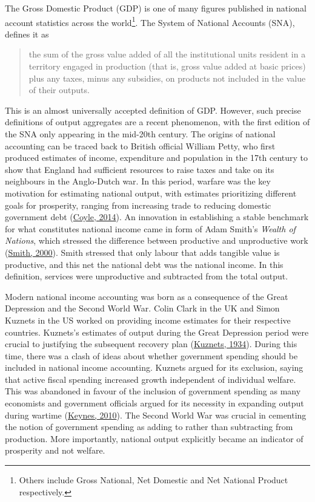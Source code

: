 \documentclass[12pt,nobind, a4paper]{reedthesis}
\begin{document}
 The Gross Domestic Product (GDP) is one of many figures published in national account statistics across the world\footnote{Others include Gross National, Net Domestic and Net National Product respectively.}. The System of National Accounts (SNA), defines it as
 \begin{quote}
 the sum of the gross value added of all the institutional units resident in a territory engaged in production (that is, gross value added at basic prices) plus any taxes, minus any subsidies, on products not included in the value of their 
 outputs.
 \end{quote}
 This is an almost universally accepted definition of GDP. However, such precise definitions of output aggregates are a recent phenomenon, with the first edition of the SNA only appearing in the mid-20th century. The origins of national accounting can be traced back to British official William Petty, who first produced estimates of income, expenditure and population in the 17th century to show that England had sufficient resources to raise taxes and take on its neighbours in the Anglo-Dutch war. In this period, warfare was the key motivation for estimating national output, with estimates prioritizing different goals for prosperity, ranging from increasing trade to reducing domestic government debt (\protect\hyperlink{ref-coyle_gdp_2014}{Coyle, 2014}). An innovation in establishing a stable benchmark for what constitutes national income came in form of Adam Smith's \emph{Wealth of Nations}, which stressed the difference between productive and unproductive work (\protect\hyperlink{ref-smith_wealth_2000}{Smith, 2000}). Smith stressed that only labour that adds tangible value is productive, and this net the national debt was the national income. In this definition, services were unproductive and subtracted from the total output.
 \linebreak

 Modern national income accounting was born as a consequence of the Great Depression and the Second World War. Colin Clark in the UK and Simon Kuznets in the US worked on providing income estimates for their respective countries. Kuznets's estimates of output during the Great Depression period were crucial to justifying the subsequent recovery plan (\protect\hyperlink{ref-kuznets_national_1934}{Kuznets, 1934}). During this time, there was a clash of ideas about whether government spending should be included in national income accounting. Kuznets argued for its exclusion, saying that active fiscal spending increased growth independent of individual welfare. This was abandoned in favour of the inclusion of government spending as many economists and government officials argued for its necessity in expanding output during wartime (\protect\hyperlink{ref-keynes_how_2010}{Keynes, 2010}). The Second World War was crucial in cementing the notion of government spending as adding to rather than subtracting from production. More importantly, national output explicitly became an indicator of prosperity and not welfare.
 \linebreak
\end{document}
